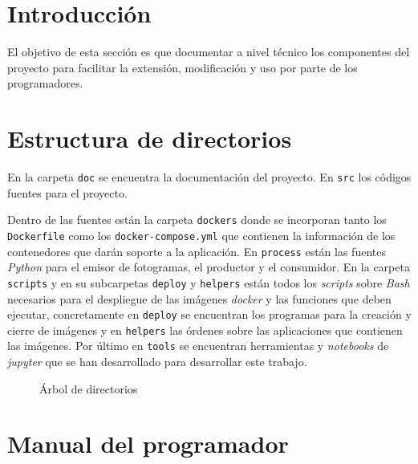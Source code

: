 
\section{Introducción}

El objetivo de esta sección es que documentar a nivel técnico los componentes del proyecto para facilitar la extensión, modificación y uso por parte de los programadores.

\section{Estructura de directorios}

En la carpeta \texttt{doc} se encuentra la documentación del proyecto. En \texttt{src} los códigos fuentes para el proyecto.

Dentro de las fuentes están la carpeta \texttt{dockers} donde se incorporan tanto los \texttt{Dockerfile} como los \texttt{docker-compose.yml} que contienen la información de los contenedores que darán soporte a la aplicación. En \texttt{process} están las fuentes \textit{Python} para el emisor de fotogramas, el productor y el consumidor. En la carpeta \texttt{scripts} y en su subcarpetas \texttt{deploy} y \texttt{helpers} están todos los \textit{scripts} sobre \textit{Bash} necesarios para el despliegue de las imágenes \textit{docker} y las funciones que deben ejecutar, concretamente en \texttt{deploy} se encuentran los programas para la creación y cierre de imágenes y en \texttt{helpers} las órdenes sobre las aplicaciones que contienen las imágenes. Por último en \texttt{tools} se encuentran herramientas y \textit{notebooks} de \textit{jupyter} que se han desarrollado para desarrollar este trabajo.

\begin{figure}
	\caption{Árbol de directorios}
	\label{fig:dirtree}
\end{figure}

\section{Manual del programador}\label{sec:manualpro}



